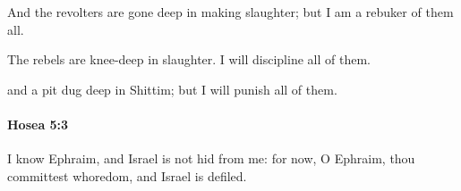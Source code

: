 			\begin{versebox}
					\item[BHS] 
					\item[LXX] 
					\item[ASV] And the revolters are gone deep in making slaughter; but I am a rebuker of them all.
					\item[NIV] The rebels are knee-deep in slaughter. I will discipline all of them.
					\item[NRSV] and a pit dug deep in Shittim; but I will punish all of them.
			\end{versebox}

		\paragraph{Hosea 5:3} %
			\label{HOSEA-5-3}

			I know Ephraim, and Israel is not hid from me: for now, O Ephraim, thou committest whoredom, and Israel is defiled.

